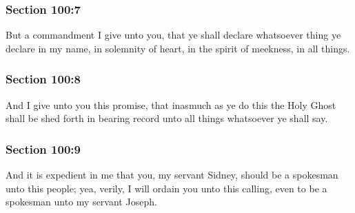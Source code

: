 	\subsubsection{Section 100:7} %
		\label{DC100-7}

		But a commandment I give unto you, that ye shall declare whatsoever thing ye declare in my name, in solemnity of heart, in the spirit of meekness, in all things.


	\subsubsection{Section 100:8} %
		\label{DC100-8}

		And I give unto you this promise, that inasmuch as ye do this the Holy Ghost shall be shed forth in bearing record unto all things whatsoever ye shall say.


	\subsubsection{Section 100:9} %
		\label{DC100-9}

		And it is expedient in me that you, my servant Sidney, should be a spokesman unto this people; yea, verily, I will ordain you unto this calling, even to be a spokesman unto my servant Joseph.


